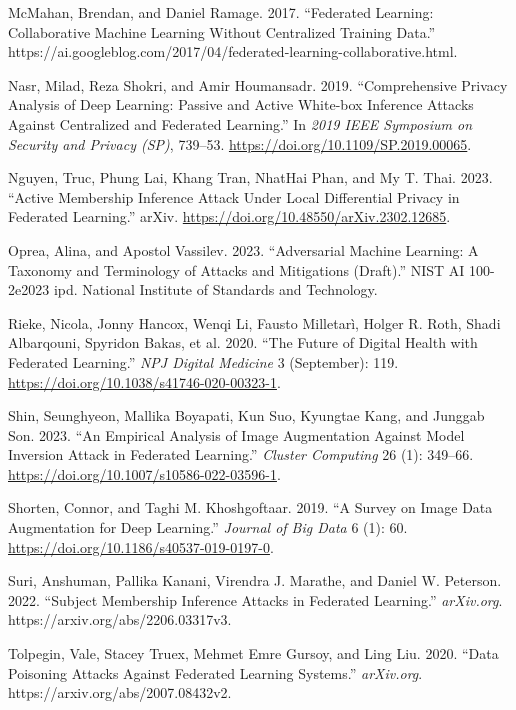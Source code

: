 \documentclass[
  compsoc]{IEEEtran}
\newlength{\cslhangindent}
\newlength{\cslentryspacingunit} %
\newenvironment{CSLReferences}[2] %
 {%
  \setlength{\parindent}{0pt}
  \ifodd #1
  \let\oldpar\par
  \def\par{\hangindent=\cslhangindent\oldpar}
  \fi
  \setlength{\parskip}{#2\cslentryspacingunit}
 }%
 {}
\begin{document}
\begin{CSLReferences}{1}{0}
\leavevmode{}%
McMahan, Brendan, and Daniel Ramage. 2017. {``Federated {Learning}:
{Collaborative Machine Learning} Without {Centralized Training Data}.''}
https://ai.googleblog.com/2017/04/federated-learning-collaborative.html.

\leavevmode{}%
Nasr, Milad, Reza Shokri, and Amir Houmansadr. 2019. {``Comprehensive
{Privacy Analysis} of {Deep Learning}: {Passive} and {Active White-box
Inference Attacks} Against {Centralized} and {Federated Learning}.''} In
\emph{2019 {IEEE Symposium} on {Security} and {Privacy} ({SP})},
739--53. \url{https://doi.org/10.1109/SP.2019.00065}.

\leavevmode{}%
Nguyen, Truc, Phung Lai, Khang Tran, NhatHai Phan, and My T. Thai. 2023.
{``Active {Membership Inference Attack} Under {Local Differential
Privacy} in {Federated Learning}.''} {arXiv}.
\url{https://doi.org/10.48550/arXiv.2302.12685}.

\leavevmode{}%
Oprea, Alina, and Apostol Vassilev. 2023. {``Adversarial {Machine
Learning}: {A Taxonomy} and {Terminology} of {Attacks} and {Mitigations}
({Draft}).''} NIST AI 100-2e2023 ipd. {National Institute of Standards
and Technology}.

\leavevmode{}%
Rieke, Nicola, Jonny Hancox, Wenqi Li, Fausto Milletarì, Holger R. Roth,
Shadi Albarqouni, Spyridon Bakas, et al. 2020. {``The Future of Digital
Health with Federated Learning.''} \emph{NPJ Digital Medicine} 3
(September): 119. \url{https://doi.org/10.1038/s41746-020-00323-1}.

\leavevmode{}%
Shin, Seunghyeon, Mallika Boyapati, Kun Suo, Kyungtae Kang, and Junggab
Son. 2023. {``An Empirical Analysis of Image Augmentation Against Model
Inversion Attack in Federated Learning.''} \emph{Cluster Computing} 26
(1): 349--66. \url{https://doi.org/10.1007/s10586-022-03596-1}.

\leavevmode{}%
Shorten, Connor, and Taghi M. Khoshgoftaar. 2019. {``A Survey on {Image
Data Augmentation} for {Deep Learning}.''} \emph{Journal of Big Data} 6
(1): 60. \url{https://doi.org/10.1186/s40537-019-0197-0}.

\leavevmode{}%
Suri, Anshuman, Pallika Kanani, Virendra J. Marathe, and Daniel W.
Peterson. 2022. {``Subject {Membership Inference Attacks} in {Federated
Learning}.''} \emph{arXiv.org}. https://arxiv.org/abs/2206.03317v3.

\leavevmode{}%
Tolpegin, Vale, Stacey Truex, Mehmet Emre Gursoy, and Ling Liu. 2020.
{``Data {Poisoning Attacks Against Federated Learning Systems}.''}
\emph{arXiv.org}. https://arxiv.org/abs/2007.08432v2.

\end{CSLReferences}
\end{document}
